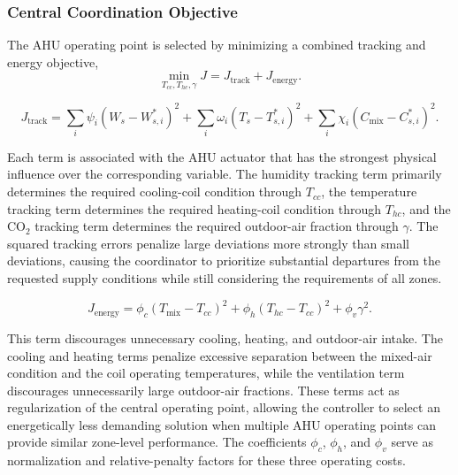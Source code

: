 \documentclass[12pt, a4paper]{article}
\begin{document}
	\subsubsection{Central Coordination Objective}
	
	The AHU operating point is selected by minimizing a combined tracking and energy objective,
	\begin{equation}
		\min_{T_{cc}, T_{hc}, \gamma}
		J
		=
		J_{\mathrm{track}}
		+
		J_{\mathrm{energy}}.
		\label{eq:coordinator_objective}
	\end{equation}
	
	\begin{equation}
		J_{\mathrm{track}}
		=
		\sum_i
		\psi_i
		\left(W_s-W_{s,i}^{*}\right)^2
		+
		\sum_i
		\omega_i
		\left(T_s-T_{s,i}^{*}\right)^2
		+
		\sum_i
		\chi_i
		\left(C_{\mathrm{mix}}-C_{s,i}^{*}\right)^2.
		\label{eq:J_track}
	\end{equation}
	
	Each term is associated with the AHU actuator that has the strongest physical influence over the corresponding variable. The humidity tracking term primarily determines the required cooling-coil condition through $T_{cc}$, the temperature tracking term determines the required heating-coil condition through $T_{hc}$, and the CO$_2$ tracking term determines the required outdoor-air fraction through $\gamma$. The squared tracking errors penalize large deviations more strongly than small deviations, causing the coordinator to prioritize substantial departures from the requested supply conditions while still considering the requirements of all zones.
	
	\begin{equation}
		J_{\mathrm{energy}} =
		\phi_c
		\left(T_{\mathrm{mix}}-T_{cc}\right)^2
		+
		\phi_h
		\left(T_{hc}-T_{cc}\right)^2
		+
		\phi_v\gamma^2.
		\label{eq:J_energy}	
	\end{equation}
	
	This term discourages unnecessary cooling, heating, and outdoor-air intake. The cooling and heating terms penalize excessive separation between the mixed-air condition and the coil operating temperatures, while the ventilation term discourages unnecessarily large outdoor-air fractions. These terms act as regularization of the central operating point, allowing the controller to select an energetically less demanding solution when multiple AHU operating points can provide similar zone-level performance. The coefficients $\phi_c$, $\phi_h$, and $\phi_v$ serve as normalization and relative-penalty factors for these three operating costs.
	
\end{document}
